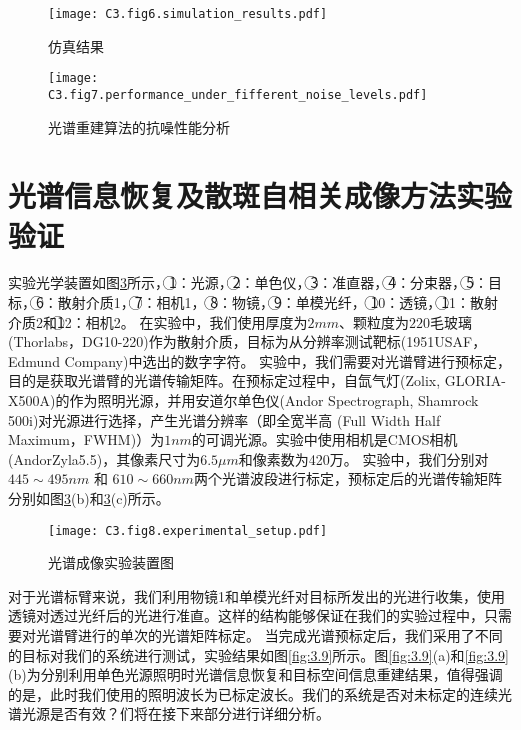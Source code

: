 \begin{figure}[htp]
	\centering
	\texttt{[image: C3.fig6.simulation\_results.pdf]}
	\caption{仿真结果}
	\label{fig:3.6}
\end{figure}

\begin{figure}[htp]
	\centering
	\texttt{[image: C3.fig7.performance\_under\_fifferent\_noise\_levels.pdf]}
	\caption{光谱重建算法的抗噪性能分析}
	\label{fig:3.7}
\end{figure}

\section{光谱信息恢复及散斑自相关成像方法实验验证}

实验光学装置如图\ref{fig:3.8}所示，{\large \textcircled{\normalsize 1}}：光源，{\large \textcircled{\normalsize 2}}：单色仪，{\large \textcircled{\normalsize 3}}：准直器，{\large \textcircled{\normalsize 4}}：分束器，{\large \textcircled{\normalsize 5}}：目标，{\large \textcircled{\normalsize 6}}：散射介质1，{\large \textcircled{\normalsize 7}}：相机1，
{\large \textcircled{\normalsize 8}}：物镜，{\large \textcircled{\normalsize 9}}：单模光纤，
{\large \textcircled{\normalsize 10}}：透镜，{\large \textcircled{\normalsize 11}}：散射介质2和{\large \textcircled{\normalsize 12}}：相机2。
在实验中，我们使用厚度为$2mm$、颗粒度为$220$毛玻璃(Thorlabs，DG10-220)作为散射介质，目标为从分辨率测试靶标(1951USAF，Edmund Company)中选出的数字字符。
实验中，我们需要对光谱臂进行预标定，目的是获取光谱臂的光谱传输矩阵。在预标定过程中，自氙气灯(Zolix, GLORIA-X500A)的作为照明光源，并用安道尔单色仪(Andor Spectrograph, Shamrock 500i)对光源进行选择，产生光谱分辨率（即全宽半高
(Full Width Half Maximum，FWHM)）为$1 nm$的可调光源。实验中使用相机是CMOS相机(AndorZyla5.5)，其像素尺寸为$6.5\mu m$和像素数为420万。
实验中，我们分别对$445 \sim 495nm$ 和 $610 \sim 660nm$两个光谱波段进行标定，预标定后的光谱传输矩阵分别如图\ref{fig:3.8}(b)和\ref{fig:3.8}(c)所示。

\begin{figure}[htp]
	\centering
	\texttt{[image: C3.fig8.experimental\_setup.pdf]}
	\caption{光谱成像实验装置图}
	\label{fig:3.8}
\end{figure}

对于光谱标臂来说，我们利用物镜1和单模光纤对目标所发出的光进行收集，使用透镜对透过光纤后的光进行准直。这样的结构能够保证在我们的实验过程中，只需要对光谱臂进行的单次的光谱矩阵标定。
当完成光谱预标定后，我们采用了不同的目标对我们的系统进行测试，实验结果如图\ref{fig:3.9}所示。图\ref{fig:3.9}(a)和\ref{fig:3.9}(b)为分别利用单色光源照明时光谱信息恢复和目标空间信息重建结果，值得强调的是，此时我们使用的照明波长为已标定波长。我们的系统是否对未标定的连续光谱光源是否有效？们将在接下来部分进行详细分析。

